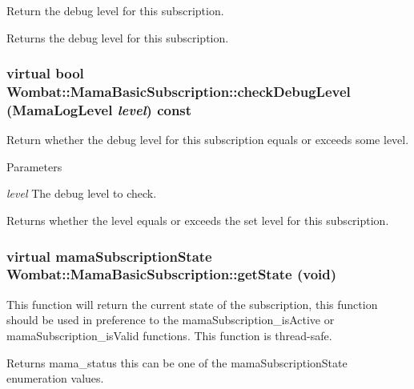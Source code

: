 Return the debug level for this subscription. \begin{DoxyReturn}{Returns}
the debug level for this subscription. 
\end{DoxyReturn}
\hypertarget{classWombat_1_1MamaBasicSubscription_aa87899a7475f0b88dd4b99ea4ddb963e}{
\subsubsection[{checkDebugLevel}]{\setlength{\rightskip}{0pt plus 5cm}virtual bool Wombat::MamaBasicSubscription::checkDebugLevel (MamaLogLevel {\em level}) const}}
\label{classWombat_1_1MamaBasicSubscription_aa87899a7475f0b88dd4b99ea4ddb963e}


Return whether the debug level for this subscription equals or exceeds some level. 
\begin{DoxyParams}{Parameters}
\item[{\em level}]The debug level to check. \end{DoxyParams}
\begin{DoxyReturn}{Returns}
whether the level equals or exceeds the set level for this subscription. 
\end{DoxyReturn}
\hypertarget{classWombat_1_1MamaBasicSubscription_a0cbca1e081927c0fec67de8a9b929f9c}{
\subsubsection[{getState}]{\setlength{\rightskip}{0pt plus 5cm}virtual mamaSubscriptionState Wombat::MamaBasicSubscription::getState (void)}}
\label{classWombat_1_1MamaBasicSubscription_a0cbca1e081927c0fec67de8a9b929f9c}


This function will return the current state of the subscription, this function should be used in preference to the mamaSubscription\_\-isActive or mamaSubscription\_\-isValid functions. This function is thread-\/safe.

\begin{DoxyReturn}{Returns}
mama\_\-status this can be one of the mamaSubscriptionState enumeration values. 
\end{DoxyReturn}


